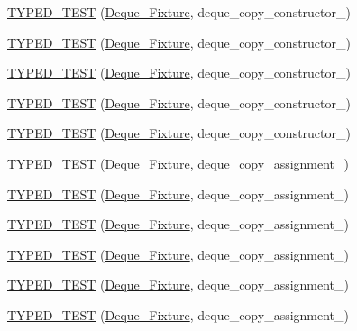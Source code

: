 \begin{DoxyCompactItemize}
\item 
\hyperlink{TestDeque_8c_09_09_ab193bc01b33de381c421610f8b8710aa}{T\-Y\-P\-E\-D\-\_\-\-T\-E\-S\-T} (\hyperlink{structDeque__Fixture}{Deque\-\_\-\-Fixture}, deque\-\_\-copy\-\_\-constructor\-\_)
\item 
\hyperlink{TestDeque_8c_09_09_a9ab39c2f3e4a8a1151244f4afa3f72fe}{T\-Y\-P\-E\-D\-\_\-\-T\-E\-S\-T} (\hyperlink{structDeque__Fixture}{Deque\-\_\-\-Fixture}, deque\-\_\-copy\-\_\-constructor\-\_)
\item 
\hyperlink{TestDeque_8c_09_09_a7bb8f0e1e3ad70a8b8bab5261fa0ce41}{T\-Y\-P\-E\-D\-\_\-\-T\-E\-S\-T} (\hyperlink{structDeque__Fixture}{Deque\-\_\-\-Fixture}, deque\-\_\-copy\-\_\-constructor\-\_)
\item 
\hyperlink{TestDeque_8c_09_09_a27e3de3b5776dcd91ffb5fbd2fd25eda}{T\-Y\-P\-E\-D\-\_\-\-T\-E\-S\-T} (\hyperlink{structDeque__Fixture}{Deque\-\_\-\-Fixture}, deque\-\_\-copy\-\_\-constructor\-\_)
\item 
\hyperlink{TestDeque_8c_09_09_ad53b991d11311f1d2d680489eae40266}{T\-Y\-P\-E\-D\-\_\-\-T\-E\-S\-T} (\hyperlink{structDeque__Fixture}{Deque\-\_\-\-Fixture}, deque\-\_\-copy\-\_\-constructor\-\_)
\item 
\hyperlink{TestDeque_8c_09_09_aec9b4bc08b9194ac6db444ee67204b7f}{T\-Y\-P\-E\-D\-\_\-\-T\-E\-S\-T} (\hyperlink{structDeque__Fixture}{Deque\-\_\-\-Fixture}, deque\-\_\-copy\-\_\-assignment\-\_)
\item 
\hyperlink{TestDeque_8c_09_09_ac1d06f2052b7a50da4cd1bffb2d99fc6}{T\-Y\-P\-E\-D\-\_\-\-T\-E\-S\-T} (\hyperlink{structDeque__Fixture}{Deque\-\_\-\-Fixture}, deque\-\_\-copy\-\_\-assignment\-\_)
\item 
\hyperlink{TestDeque_8c_09_09_abfe47fc30d17c904047e8bb94e1368df}{T\-Y\-P\-E\-D\-\_\-\-T\-E\-S\-T} (\hyperlink{structDeque__Fixture}{Deque\-\_\-\-Fixture}, deque\-\_\-copy\-\_\-assignment\-\_)
\item 
\hyperlink{TestDeque_8c_09_09_a8aa54fcc0f490f98c2198ba2a8787b17}{T\-Y\-P\-E\-D\-\_\-\-T\-E\-S\-T} (\hyperlink{structDeque__Fixture}{Deque\-\_\-\-Fixture}, deque\-\_\-copy\-\_\-assignment\-\_)
\item 
\hyperlink{TestDeque_8c_09_09_a4d09378c46d9d3b0a96fafc12ef4f391}{T\-Y\-P\-E\-D\-\_\-\-T\-E\-S\-T} (\hyperlink{structDeque__Fixture}{Deque\-\_\-\-Fixture}, deque\-\_\-copy\-\_\-assignment\-\_)
\item 
\hyperlink{TestDeque_8c_09_09_acaf0f13bf9a98b364141f6f5522fec90}{T\-Y\-P\-E\-D\-\_\-\-T\-E\-S\-T} (\hyperlink{structDeque__Fixture}{Deque\-\_\-\-Fixture}, deque\-\_\-copy\-\_\-assignment\-\_)

\end{DoxyCompactItemize}
